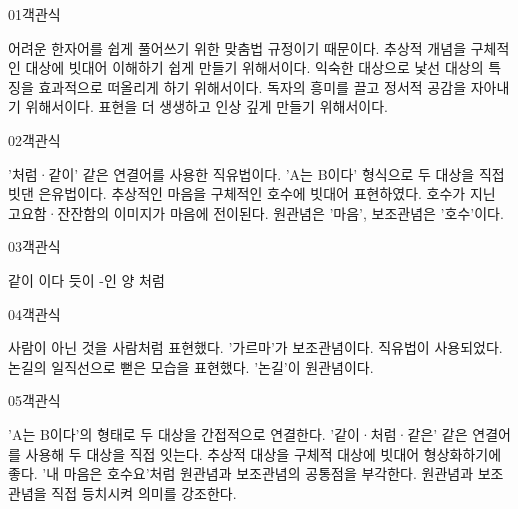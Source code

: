 \documentclass[fs85,seriesRus]{korfarm-base}
\begin{document}
\par\medskip
\kfBeginMC
\begin{kfQBlock}{01}{객관식}
\begin{kfChoices}
\kfChoice 어려운 한자어를 쉽게 풀어쓰기 위한 맞춤법 규정이기 때문이다.
\kfChoice 추상적 개념을 구체적인 대상에 빗대어 이해하기 쉽게 만들기 위해서이다.
\kfChoice 익숙한 대상으로 낯선 대상의 특징을 효과적으로 떠올리게 하기 위해서이다.
\kfChoice 독자의 흥미를 끌고 정서적 공감을 자아내기 위해서이다.
\kfChoice 표현을 더 생생하고 인상 깊게 만들기 위해서이다.
\end{kfChoices}
\end{kfQBlock}
\begin{kfQBlock}{02}{객관식}
\begin{kfChoices}
\kfChoice '처럼·같이' 같은 연결어를 사용한 직유법이다.
\kfChoice 'A는 B이다' 형식으로 두 대상을 직접 빗댄 은유법이다.
\kfChoice 추상적인 마음을 구체적인 호수에 빗대어 표현하였다.
\kfChoice 호수가 지닌 고요함·잔잔함의 이미지가 마음에 전이된다.
\kfChoice 원관념은 '마음', 보조관념은 '호수'이다.
\end{kfChoices}
\end{kfQBlock}
\begin{kfQBlock}{03}{객관식}
\begin{kfChoices}
\kfChoice 같이
\kfChoice 이다
\kfChoice 듯이
\kfChoice -인 양
\kfChoice 처럼
\end{kfChoices}
\end{kfQBlock}
\begin{kfQBlock}{04}{객관식}
\begin{kfChoices}
\kfChoice 사람이 아닌 것을 사람처럼 표현했다.
\kfChoice '가르마'가 보조관념이다.
\kfChoice 직유법이 사용되었다.
\kfChoice 논길의 일직선으로 뻗은 모습을 표현했다.
\kfChoice '논길'이 원관념이다.
\end{kfChoices}
\end{kfQBlock}
\begin{kfQBlock}{05}{객관식}
\begin{kfChoices}
\kfChoice 'A는 B이다'의 형태로 두 대상을 간접적으로 연결한다.
\kfChoice '같이·처럼·같은' 같은 연결어를 사용해 두 대상을 직접 잇는다.
\kfChoice 추상적 대상을 구체적 대상에 빗대어 형상화하기에 좋다.
\kfChoice '내 마음은 호수요'처럼 원관념과 보조관념의 공통점을 부각한다.
\kfChoice 원관념과 보조관념을 직접 등치시켜 의미를 강조한다.
\end{kfChoices}
\end{kfQBlock}
\end{document}
